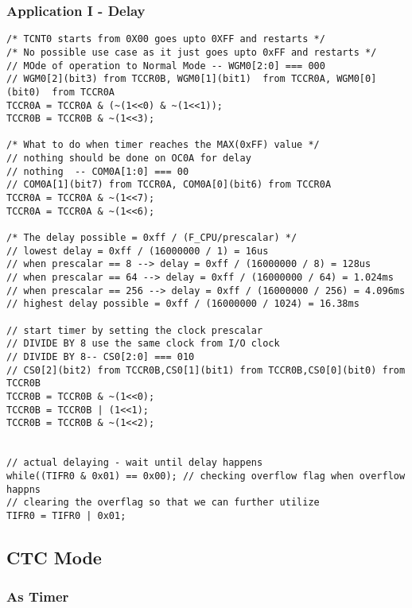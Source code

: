 \subsubsection{Application I - Delay}
\begin{verbatim}
/* TCNT0 starts from 0X00 goes upto 0XFF and restarts */
/* No possible use case as it just goes upto 0xFF and restarts */
// MOde of operation to Normal Mode -- WGM0[2:0] === 000
// WGM0[2](bit3) from TCCR0B, WGM0[1](bit1)  from TCCR0A, WGM0[0](bit0)  from TCCR0A
TCCR0A = TCCR0A & (~(1<<0) & ~(1<<1));
TCCR0B = TCCR0B & ~(1<<3);

/* What to do when timer reaches the MAX(0xFF) value */
// nothing should be done on OC0A for delay
// nothing  -- COM0A[1:0] === 00
// COM0A[1](bit7) from TCCR0A, COM0A[0](bit6) from TCCR0A
TCCR0A = TCCR0A & ~(1<<7);
TCCR0A = TCCR0A & ~(1<<6);
    
/* The delay possible = 0xff / (F_CPU/prescalar) */
// lowest delay = 0xff / (16000000 / 1) = 16us
// when prescalar == 8 --> delay = 0xff / (16000000 / 8) = 128us
// when prescalar == 64 --> delay = 0xff / (16000000 / 64) = 1.024ms
// when prescalar == 256 --> delay = 0xff / (16000000 / 256) = 4.096ms
// highest delay possible = 0xff / (16000000 / 1024) = 16.38ms

// start timer by setting the clock prescalar
// DIVIDE BY 8 use the same clock from I/O clock
// DIVIDE BY 8-- CS0[2:0] === 010
// CS0[2](bit2) from TCCR0B,CS0[1](bit1) from TCCR0B,CS0[0](bit0) from TCCR0B
TCCR0B = TCCR0B & ~(1<<0);
TCCR0B = TCCR0B | (1<<1);
TCCR0B = TCCR0B & ~(1<<2);


// actual delaying - wait until delay happens
while((TIFR0 & 0x01) == 0x00); // checking overflow flag when overflow happns
// clearing the overflag so that we can further utilize
TIFR0 = TIFR0 | 0x01;
\end{verbatim}

\subsection{CTC Mode}
\subsubsection{As Timer}

